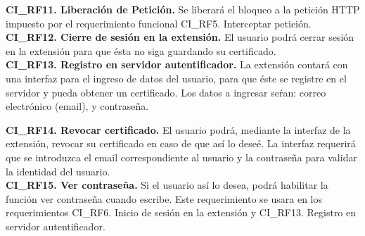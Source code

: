 \documentclass[12pt, a4paper, titlepage]{report}
\begin{document}
{                \textbf{CI\_RF11. Liberaci\'on de Petición.} Se liberar\'a el bloqueo a la petici\'on HTTP impuesto por el requerimiento funcional CI\_RF5. Interceptar petición.\\
                
                \textbf{CI\_RF12. Cierre de sesión en la extensión.} El usuario podrá cerrar sesión en la extensión para que ésta no siga guardando su certificado.\\
                
                \textbf{CI\_RF13. Registro en servidor autentificador.} La extensión contará con una interfaz para el ingreso de datos del usuario, para que éste se registre en el servidor y pueda obtener un certificado. Los datos a ingresar seŕan: correo electrónico (email), y contraseña.\\
                \label{CI_RF13}
                
                \textbf{CI\_RF14. Revocar certificado.} El usuario podrá, mediante la interfaz de la extensión, revocar su certificado en caso de que así lo deseé. La interfaz requerirá que se introduzca el email correspondiente al usuario y la contraseña para validar la identidad del usuario. \\
                
                \textbf{CI\_RF15. Ver contraseña.} Si el usuario así lo desea, podrá habilitar la función ver contraseña cuando escribe. Este requerimiento se usara en los requerimientos CI\_RF6. Inicio de sesión en la extensión y CI\_RF13. Registro en servidor autentificador.\\
                
                
		        }
				
\end{document}
